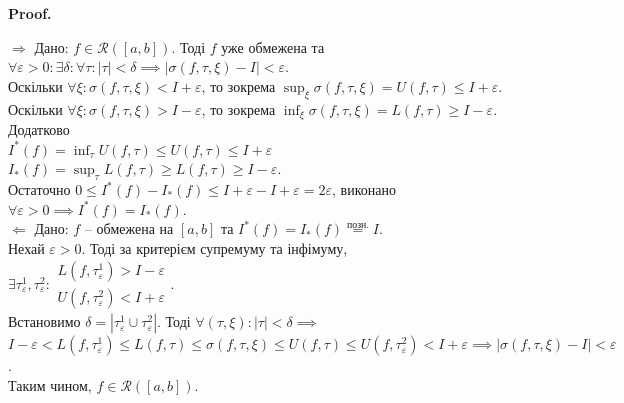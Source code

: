 \documentclass[a4paper, 10pt]{article}
\makeatletter
\def\huge{\displaystyle}
\def\rightproof{$\boxed{\Rightarrow}$ }
\def\leftproof{$\boxed{\Leftarrow}$ }
\theoremstyle{theoremdd}
\theoremstyle{theoremdd}
\theoremstyle{theoremdd}
\theoremstyle{theoremdd}
\theoremstyle{theoremdd}
\theoremstyle{theoremdd}
\theoremstyle{theoremdd}
\theoremstyle{theoremdd}
\theoremstyle{theoremdd}
\renewenvironment{proof}[1][Proof.\\]{\par
\pushQED{\hfill \qed}%
\normalfont \topsep6\p@\@plus6\p@\relax
\trivlist
\item\relax
{\bfseries
#1\@addpunct{.}}\hspace\labelsep\ignorespaces
}{%
\popQED\endtrivlist\@endpefalse
}
\makeatother
\begin{document}
\begin{proof}
\rightproof Дано: $f \in \mathcal{R}([a,b])$. Тоді $f$ уже обмежена та $\forall \varepsilon > 0: \exists \delta: \forall \tau: |\tau| < \delta \implies |\sigma(f, \tau, \xi) - I| < \varepsilon$.\\
Оскільки $\forall \xi: \sigma(f, \tau, \xi) < I + \varepsilon$, то зокрема $\huge\sup_{\xi} \sigma(f, \tau, \xi) = U(f,\tau) \leq I + \varepsilon$.\\
Оскільки $\forall \xi: \sigma(f, \tau, \xi) > I - \varepsilon$, то зокрема $\huge\inf_{\xi} \sigma(f, \tau, \xi) = L(f,\tau) \geq I - \varepsilon$.\\
Додатково \\
$I^*(f) = \huge\inf_\tau U(f,\tau) \leq U(f,\tau) \leq I + \varepsilon$\\
$I_*(f) = \huge\sup_\tau L(f,\tau) \geq L(f,\tau) \geq I - \varepsilon$.\\
Остаточно $0 \leq I^*(f) - I_*(f) \leq I+\varepsilon - I + \varepsilon = 2\varepsilon$, виконано $\forall \varepsilon > 0 \implies I^*(f) = I_*(f)$.
\bigskip \\
\leftproof Дано: $f$ -- обмежена на $[a,b]$ та $I^*(f) = I_*(f) \overset{\text{позн.}}{=} I$.\\
Нехай $\varepsilon > 0$. Тоді за критерієм супремуму та інфімуму, $\exists \tau_\varepsilon^1, \tau_\varepsilon^2: \begin{gathered} L(f,\tau_\varepsilon^1) > I - \varepsilon \\ U(f,\tau_\varepsilon^2) < I+\varepsilon \end{gathered}$.\\
Встановимо $\delta = |\tau^1_\varepsilon \cup \tau^2_\varepsilon|$. Тоді $\forall (\tau,\xi): |\tau| < \delta \implies$\\
$I-\varepsilon < L(f,\tau_\varepsilon^1) \leq L(f,\tau) \leq \sigma(f,\tau,\xi) \leq U(f,\tau) \leq U(f,\tau_\varepsilon^2) < I+\varepsilon \implies |\sigma(f,\tau,\xi) - I| < \varepsilon$.\\
Таким чином, $f \in \mathcal{R}([a,b])$.
\end{proof}
\end{document}
